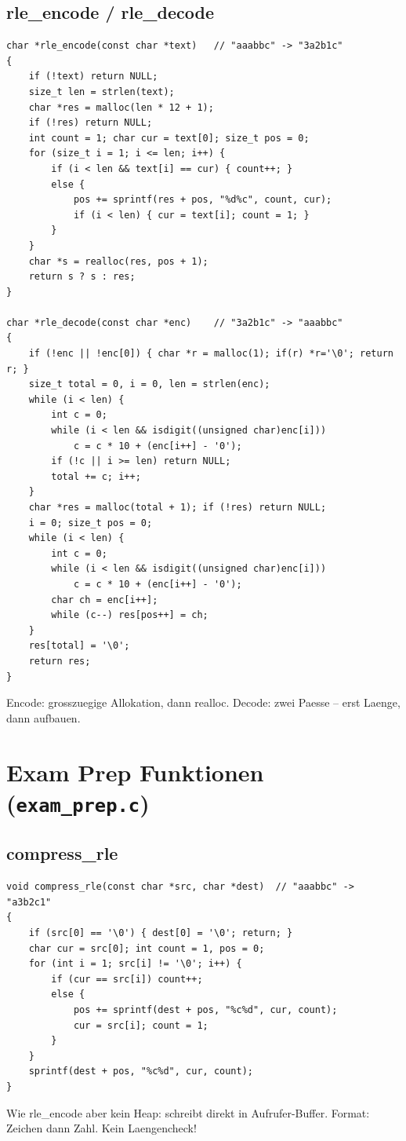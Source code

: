 \documentclass[10pt, a4paper]{article}
\begin{document}
\subsection{rle\_encode / rle\_decode}
\begin{lstlisting}
char *rle_encode(const char *text)   // "aaabbc" -> "3a2b1c"
{
    if (!text) return NULL;
    size_t len = strlen(text);
    char *res = malloc(len * 12 + 1);
    if (!res) return NULL;
    int count = 1; char cur = text[0]; size_t pos = 0;
    for (size_t i = 1; i <= len; i++) {
        if (i < len && text[i] == cur) { count++; }
        else {
            pos += sprintf(res + pos, "%d%c", count, cur);
            if (i < len) { cur = text[i]; count = 1; }
        }
    }
    char *s = realloc(res, pos + 1);
    return s ? s : res;
}

char *rle_decode(const char *enc)    // "3a2b1c" -> "aaabbc"
{
    if (!enc || !enc[0]) { char *r = malloc(1); if(r) *r='\0'; return r; }
    size_t total = 0, i = 0, len = strlen(enc);
    while (i < len) {
        int c = 0;
        while (i < len && isdigit((unsigned char)enc[i]))
            c = c * 10 + (enc[i++] - '0');
        if (!c || i >= len) return NULL;
        total += c; i++;
    }
    char *res = malloc(total + 1); if (!res) return NULL;
    i = 0; size_t pos = 0;
    while (i < len) {
        int c = 0;
        while (i < len && isdigit((unsigned char)enc[i]))
            c = c * 10 + (enc[i++] - '0');
        char ch = enc[i++];
        while (c--) res[pos++] = ch;
    }
    res[total] = '\0';
    return res;
}
\end{lstlisting}
Encode: grosszuegige Allokation, dann realloc. Decode: zwei Paesse -- erst Laenge, dann aufbauen.

\section{Exam Prep Funktionen (\texttt{exam\_prep.c})}

\subsection{compress\_rle}
\begin{lstlisting}
void compress_rle(const char *src, char *dest)  // "aaabbc" -> "a3b2c1"
{
    if (src[0] == '\0') { dest[0] = '\0'; return; }
    char cur = src[0]; int count = 1, pos = 0;
    for (int i = 1; src[i] != '\0'; i++) {
        if (cur == src[i]) count++;
        else {
            pos += sprintf(dest + pos, "%c%d", cur, count);
            cur = src[i]; count = 1;
        }
    }
    sprintf(dest + pos, "%c%d", cur, count);
}
\end{lstlisting}
Wie rle\_encode aber kein Heap: schreibt direkt in Aufrufer-Buffer. Format: Zeichen dann Zahl. Kein Laengencheck!
\end{document}
